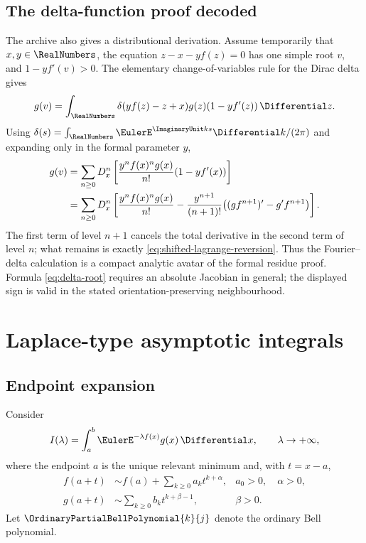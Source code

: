 \documentclass[11pt,a4paper,oneside,openany]{book}
\theoremstyle{definition}
\theoremstyle{remark}
\begin{document}
\section{The delta-function proof decoded}
The archive also gives a distributional derivation.  Assume temporarily that
$x,y\in\RealNumbers$, the equation $z-x-yf(z)=0$ has one simple root $v$, and
$1-yf'(v)>0$.  The elementary change-of-variables rule for the Dirac delta gives
\begin{equation}\label{eq:delta-root}
 g(v)=\int_{\RealNumbers}\delta(yf(z)-z+x)g(z)(1-yf'(z))\,\Differential z.
\end{equation}
Using
$\delta(s)=\int_{\RealNumbers}\EulerE^{\ImaginaryUnit ks}\Differential k/(2\pi)$ and expanding only in the formal
parameter $y$,
\begin{align}
 g(v)
 &=\sum_{n\ge0}D_x^n\left[
 \frac{y^nf(x)^ng(x)}{n!}(1-yf'(x))\right]\notag\\
 &=\sum_{n\ge0}D_x^n\left[
 \frac{y^nf(x)^ng(x)}{n!}
 -\frac{y^{n+1}}{(n+1)!}\bigl((gf^{n+1})'-g'f^{n+1}\bigr)
 \right].
 \label{eq:delta-reversion-middle}
\end{align}
The first term of level $n+1$ cancels the total derivative in the second term of
level $n$; what remains is exactly
\eqref{eq:shifted-lagrange-reversion}.  Thus the Fourier--delta calculation is a
compact analytic avatar of the formal residue proof.  Formula
\eqref{eq:delta-root} requires an absolute Jacobian in general; the displayed sign
is valid in the stated orientation-preserving neighbourhood.

\chapter{Laplace-type asymptotic integrals}

\section{Endpoint expansion}
Consider
\begin{equation}\label{eq:laplace-integral}
 I(\lambda)=\int_a^b \EulerE^{-\lambda f(x)}g(x)\,\Differential x,
 \qquad \lambda\to+\infty,
\end{equation}
where the endpoint $a$ is the unique relevant minimum and, with $t=x-a$,
\begin{align}
 f(a+t)&\sim f(a)+\sum_{k\ge0}a_kt^{k+\alpha},
 &a_0>0,\quad\alpha>0,
 \label{eq:laplace-f-expansion}\\
 g(a+t)&\sim\sum_{k\ge0}b_kt^{k+\beta-1},
 &\beta>0.
 \label{eq:laplace-g-expansion}
\end{align}
Let $\OrdinaryPartialBellPolynomial{k}{j}$ denote the ordinary Bell polynomial.
\end{document}

